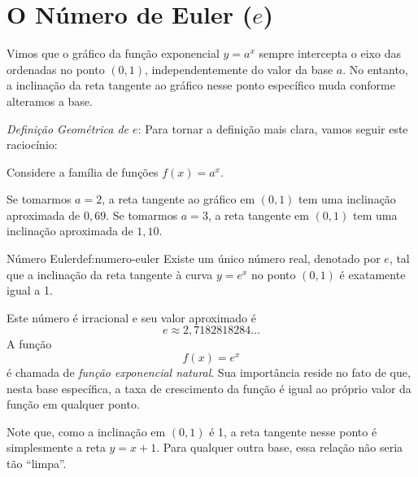 \section{O Número de Euler ($e$)}

Vimos que o gráfico da função exponencial $y = a^x$ sempre intercepta o eixo
das ordenadas no ponto $(0, 1)$, independentemente do valor da base $a$. No
entanto, a inclinação da reta tangente ao gráfico nesse ponto específico muda
conforme alteramos a base.

\emph{Definição Geométrica de $e$}:
Para tornar a definição mais clara, vamos seguir este raciocínio:

Considere a família de funções $f(x) = a^x$.

Se tomarmos $a = 2$, a reta tangente ao gráfico em $(0, 1)$ tem uma
inclinação aproximada de $0,69$.
Se tomarmos $a = 3$, a reta tangente em $(0, 1)$ tem uma inclinação
aproximada de $1,10$.

\begin{definicao}{Número Euler}{def:numero-euler}
  Existe um único número real, denotado por $e$,
  tal que a inclinação da reta tangente à curva $y = e^x$ no ponto $(0, 1)$
  é exatamente igual a 1.
\end{definicao}

Este número é irracional e seu valor aproximado é
\[
  e \approx 2,7182818284\dots
\]
A função
\[
    f(x) = e^x
\]
é chamada de
\emph{função exponencial natural}.
Sua importância reside no fato de que, nesta base específica,
a taxa de crescimento da função é igual ao próprio valor da
função em qualquer ponto.

\begin{observation}
  Note que, como a inclinação em $(0, 1)$ é 1, a reta tangente nesse ponto é
  simplesmente a reta $y = x + 1$. Para qualquer outra base, essa relação não
  seria tão ``limpa''.
\end{observation}

